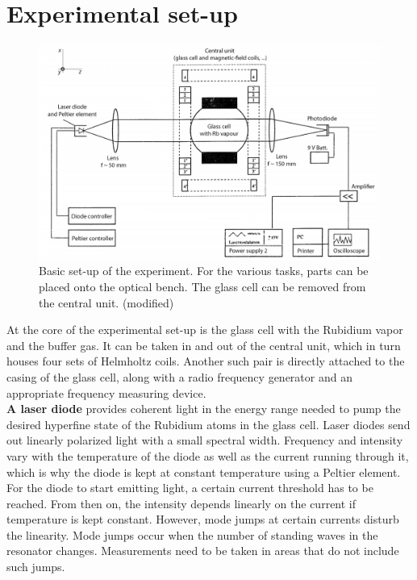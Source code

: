 \section{Experimental set-up}
\begin{figure}[h]
\centering
\includegraphics[width=1.0\linewidth]{graphics/generalsetup}
\caption[Basic experimental set-up]{Basic set-up of the experiment. For the various tasks, parts can be placed onto the optical bench. The glass cell can be removed from the central unit. \cite{anleitung} (modified)}
\label{fig:general setup}
\end{figure}
At the core of the experimental set-up is the glass cell with the Rubidium vapor and the buffer gas. It can be taken in and out of the central unit, which in turn houses four sets of Helmholtz coils. Another such pair is directly attached to the casing of the glass cell, along with a radio frequency generator and an appropriate frequency measuring device.\\

\textbf{A laser diode} provides coherent light in the energy range needed to pump the desired hyperfine state of the Rubidium atoms in the glass cell. Laser diodes send out linearly polarized light with a small spectral width. Frequency and intensity vary with the temperature of the diode as well as the current running through it, which is why the diode is kept at constant temperature using a Peltier element. For the diode to start emitting light, a certain current threshold has to be reached. From then on, the intensity depends linearly on the current if temperature is kept constant. However, mode jumps at certain currents disturb the linearity. Mode jumps occur when the number of standing waves in the resonator changes. Measurements need to be taken in areas that do not include such jumps.\\

